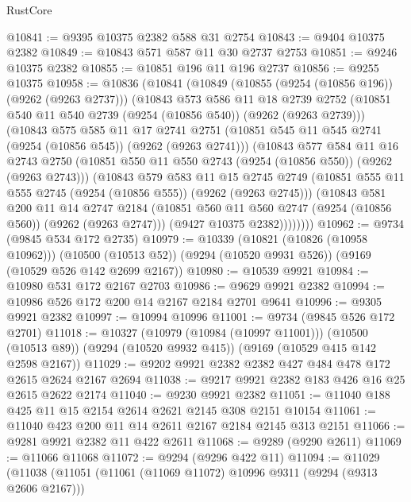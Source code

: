 \begin{lexlean}{RustCore}
\begin{coremodule}
@10841 := @9395 @10375 @2382 @588 @31 @2754
@10843 := @9404 @10375 @2382
@10849 := @10843 @571 @587 @11 @30 @2737 @2753
@10851 := @9246 @10375 @2382
@10855 := @10851 @196 @11 @196 @2737
@10856 := @9255 @10375
@10958 := @10836
    (@10841
      (@10849
        (@10855 (@9254 (@10856 @196)) (@9262 (@9263 @2737)))
        (@10843
          @573
          @586
          @11
          @18
          @2739
          @2752
          (@10851 @540 @11 @540 @2739 (@9254 (@10856 @540)) (@9262 (@9263 @2739)))
          (@10843
            @575
            @585
            @11
            @17
            @2741
            @2751
            (@10851 @545 @11 @545 @2741 (@9254 (@10856 @545)) (@9262 (@9263 @2741)))
            (@10843
              @577
              @584
              @11
              @16
              @2743
              @2750
              (@10851 @550 @11 @550 @2743 (@9254 (@10856 @550)) (@9262 (@9263 @2743)))
              (@10843
                @579
                @583
                @11
                @15
                @2745
                @2749
                (@10851 @555 @11 @555 @2745 (@9254 (@10856 @555)) (@9262 (@9263 @2745)))
                (@10843
                  @581
                  @200
                  @11
                  @14
                  @2747
                  @2184
                  (@10851 @560 @11 @560 @2747 (@9254 (@10856 @560)) (@9262 (@9263 @2747)))
                  (@9427 @10375 @2382))))))))
@10962 := @9734 (@9845 @534 @172 @2735)
@10979 := @10339
    (@10821 (@10826 (@10958 @10962)))
    (@10500 (@10513 @52))
    (@9294 (@10520 @9931 @526))
    (@9169 (@10529 @526 @142 @2699 @2167))
@10980 := @10539 @9921
@10984 := @10980 @531 @172 @2167 @2703
@10986 := @9629 @9921 @2382
@10994 := @10986 @526 @172 @200 @14 @2167 @2184 @2701 @9641
@10996 := @9305 @9921 @2382
@10997 := @10994 @10996
@11001 := @9734 (@9845 @526 @172 @2701)
@11018 := @10327
    (@10979 (@10984 (@10997 @11001)))
    (@10500 (@10513 @89))
    (@9294 (@10520 @9932 @415))
    (@9169 (@10529 @415 @142 @2598 @2167))
@11029 := @9202 @9921 @2382 @2382 @427 @484 @478 @172 @2615 @2624 @2167 @2694
@11038 := @9217 @9921 @2382 @183 @426 @16 @25 @2615 @2622 @2174
@11040 := @9230 @9921 @2382
@11051 := @11040 @188 @425 @11 @15 @2154 @2614 @2621 @2145 @308 @2151 @10154
@11061 := @11040 @423 @200 @11 @14 @2611 @2167 @2184 @2145 @313 @2151
@11066 := @9281 @9921 @2382 @11 @422 @2611
@11068 := @9289 (@9290 @2611)
@11069 := @11066 @11068
@11072 := @9294 (@9296 @422 @11)
@11094 := @11029
    (@11038
      (@11051
        (@11061 (@11069 @11072) @10996 @9311 (@9294 (@9313 @2606 @2167)))

\end{coremodule}
\end{lexlean}
